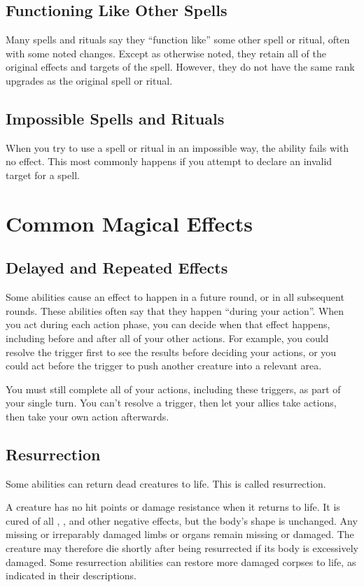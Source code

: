   \subsection{Functioning Like Other Spells}\label{Functioning Like Other Spells}
    Many spells and rituals say they ``function like'' some other spell or ritual, often with some noted changes.
    Except as otherwise noted, they retain all of the original effects and targets of the spell.
    However, they do not have the same rank upgrades as the original spell or ritual.

  \subsection{Impossible Spells and Rituals}
    When you try to use a spell or ritual in an impossible way, the ability fails with no effect.
    This most commonly happens if you attempt to declare an invalid target for a spell.

\section{Common Magical Effects}
  \subsection{Delayed and Repeated Effects}\label{Delayed and Repeated Effects}
    Some abilities cause an effect to happen in a future round, or in all subsequent rounds.
    These abilities often say that they happen ``during your action''.
    When you act during each action phase, you can decide when that effect happens, including before and after all of your other actions.
    For example, you could resolve the trigger first to see the results before deciding your actions, or you could act before the trigger to push another creature into a relevant area.

    You must still complete all of your actions, including these triggers, as part of your single turn.
    You can't resolve a trigger, then let your allies take actions, then take your own action afterwards.

  \subsection{Resurrection}\label{Resurrection}
    Some abilities can return dead creatures to life.
    This is called resurrection.

    A creature has no hit points or damage resistance when it returns to life.
    It is cured of all , , and other negative effects, but the body's shape is unchanged.
    Any missing or irreparably damaged limbs or organs remain missing or damaged.
    The creature may therefore die shortly after being resurrected if its body is excessively damaged.
    Some resurrection abilities can restore more damaged corpses to life, as indicated in their descriptions.

